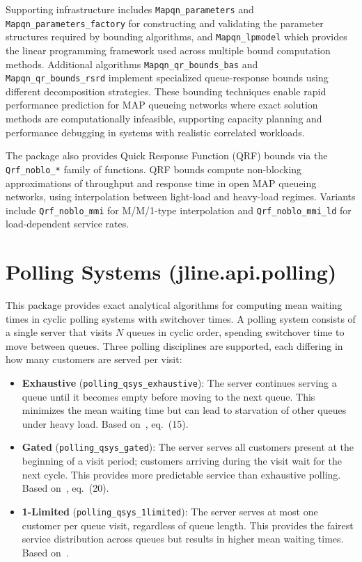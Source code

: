 Supporting infrastructure includes \texttt{Mapqn\_parameters} and \texttt{Mapqn\_parameters\_factory} for constructing and validating the parameter structures required by bounding algorithms, and \texttt{Mapqn\_lpmodel} which provides the linear programming framework used across multiple bound computation methods. Additional algorithms \texttt{Mapqn\_qr\_bounds\_bas} and \texttt{Mapqn\_qr\_bounds\_rsrd} implement specialized queue-response bounds using different decomposition strategies. These bounding techniques enable rapid performance prediction for MAP queueing networks where exact solution methods are computationally infeasible, supporting capacity planning and performance debugging in systems with realistic correlated workloads.

The package also provides Quick Response Function (QRF) bounds via the \texttt{Qrf\_noblo\_*} family of functions. QRF bounds compute non-blocking approximations of throughput and response time in open MAP queueing networks, using interpolation between light-load and heavy-load regimes. Variants include \texttt{Qrf\_noblo\_mmi} for M/M/1-type interpolation and \texttt{Qrf\_noblo\_mmi\_ld} for load-dependent service rates.

\section{Polling Systems (jline.api.polling)}

This package provides exact analytical algorithms for computing mean waiting times in cyclic polling systems with switchover times. A polling system consists of a single server that visits $N$ queues in cyclic order, spending switchover time to move between queues. Three polling disciplines are supported, each differing in how many customers are served per visit:

\begin{itemize}
\item \textbf{Exhaustive} (\texttt{polling\_qsys\_exhaustive}): The server continues serving a queue until it becomes empty before moving to the next queue. This minimizes the mean waiting time but can lead to starvation of other queues under heavy load. Based on~\cite{Tak88}, eq.\ (15).
\item \textbf{Gated} (\texttt{polling\_qsys\_gated}): The server serves all customers present at the beginning of a visit period; customers arriving during the visit wait for the next cycle. This provides more predictable service than exhaustive polling. Based on~\cite{Tak88}, eq.\ (20).
\item \textbf{1-Limited} (\texttt{polling\_qsys\_1limited}): The server serves at most one customer per queue visit, regardless of queue length. This provides the fairest service distribution across queues but results in higher mean waiting times. Based on~\cite{BoxM86}.
\end{itemize}

